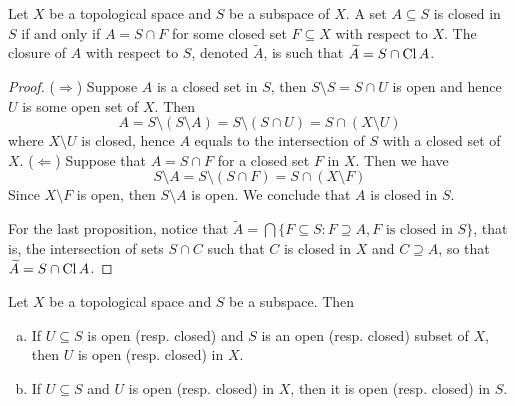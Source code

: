 \begin{proposition}\label{prop: closed in subspace}
    Let \(X\) be a topological space and \(S\) be a subspace of \(X\). A set
    \(A \subseteq S\) is closed in \(S\) if and only if \(A = S \cap F\) for some
    closed set \(F \subseteq X\) with respect to \(X\). The closure of \(A\) with
    respect to \(S\), denoted \(\widetilde A\), is such that
    \(\widetilde A = S \cap \operatorname{Cl} A\).
\end{proposition}

\begin{proof}
    (\(\Rightarrow\)) Suppose \(A\) is a closed set in \(S\), then \(S \setminus
    S = S \cap U\) is open and hence \(U\) is some open set of \(X\). Then
    \[
        A = S \setminus (S \setminus A) = S \setminus (S \cap U)
        = S \cap (X \setminus U)
    \]
    where \(X \setminus U\) is closed, hence \(A\) equals to the intersection of
    \(S\) with a closed set of \(X\).
    (\(\Leftarrow\)) Suppose that \(A = S \cap F\) for a closed set \(F\) in
    \(X\). Then we have
    \[
        S \setminus A = S \setminus (S \cap F) = S \cap (X \setminus F)
    \]
    Since \(X\setminus F\) is open, then \(S \setminus A\) is open. We conclude
    that \(A\) is closed in \(S\).

    For the last proposition, notice that \(\widetilde A = \bigcap \{F \subseteq S
    \colon F \supseteq A, F \text{ is closed in } S\}\), that is, the intersection of
    sets \(S \cap C\) such that \(C\) is closed in \(X\) and \(C \supseteq A\), so
    that \(\widetilde A = S \cap \operatorname{Cl} A\).
\end{proof}

\begin{proposition}\label{prop: relative open to open}
    Let \(X\) be a topological space and \(S\) be a subspace. Then
    \begin{enumerate}[(a)]\setlength\itemsep{0em}
        \item If \(U \subseteq S\) is open (resp. closed) and \(S\) is an open
              (resp. closed) subset of \(X\), then \(U\) is open (resp. closed) in
              \(X\).
        \item If \(U \subseteq S\) and \(U\) is open (resp. closed) in \(X\), then
              it is open (resp. closed) in \(S\).
    \end{enumerate}
\end{proposition}

